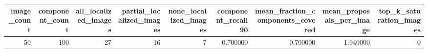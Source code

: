 \begin{tabular}{rrrrrrrrr}
\toprule
image_count & component_count & all_localized_images & partial_localized_images & none_localized_images & component_recall90 & mean_fraction_components_covered & mean_proposals_per_image & top_k_saturation_images \\
\midrule
50 & 100 & 27 & 16 & 7 & 0.700000 & 0.700000 & 1.940000 & 0 \\
\bottomrule
\end{tabular}
